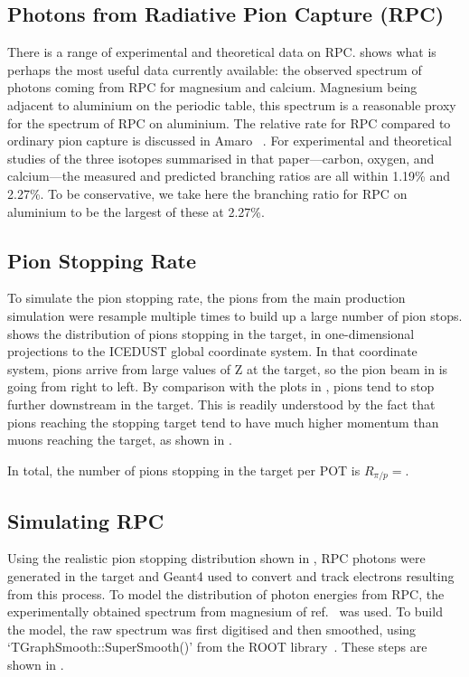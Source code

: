 \subsection{Photons from Radiative Pion Capture (\acs{RPC})}
There is a range of experimental and theoretical data on \ac{RPC}. 
 shows what is perhaps the most useful data currently available: the observed spectrum of photons coming from RPC for magnesium and calcium.
Magnesium being adjacent to aluminium on the periodic table, this spectrum is a reasonable proxy for the spectrum of \ac{RPC} on aluminium.
The relative rate for \ac{RPC} compared to ordinary pion capture is discussed in Amaro \etal~\cite{Amaro:1997ed}.
For experimental and theoretical studies of the three isotopes summarised in that paper---carbon, oxygen, and calcium---the measured and predicted branching ratios are all within 1.19\% and 2.27\%.
To be conservative, we take here the branching ratio for RPC on aluminium to be the largest of these at 2.27\%.

\subsection{Pion Stopping Rate}
\FigPionStopDist
\FigPiVsMuMomenta
To simulate the pion stopping rate, the pions from the main production simulation were resample multiple times to build up a large number of pion stops.
 shows the distribution of pions stopping in the target, in one-dimensional projections to the ICEDUST global coordinate system.
In that coordinate system, pions arrive from large values of Z at the target, so the pion beam in  is going from right to left.
By comparison with the plots in , pions tend to stop further downstream in the target.
This is readily understood by the fact that pions reaching the stopping target tend to have much higher momentum than muons reaching the target, as shown in .

In total, the number of pions stopping in the target per \ac{POT} is $R_{\pi/p}=$\VarPiStopsPerPOT.

\subsection{Simulating \acs{RPC}}
\FigRPCSimulatedSpectrum
\FigRPCSimResults
Using the realistic pion stopping distribution shown in , \ac{RPC} photons were generated in the target and Geant4 used to convert and track electrons resulting from this process.
To model the distribution of photon energies from \ac{RPC}, the experimentally obtained spectrum from magnesium of ref.~\cite{Bistirlich:1972jy} was used.
To build the model, the raw spectrum was first digitised and then smoothed, using `TGraphSmooth::SuperSmooth()' from the  ROOT library~\cite{ROOT}.
These steps are shown in .

